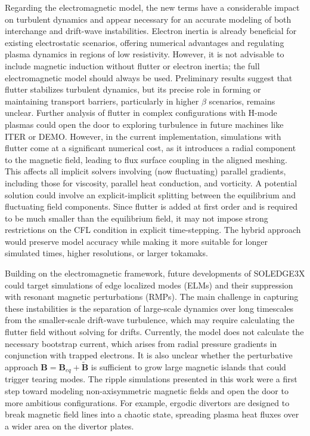 Regarding the electromagnetic model, the new terms have a considerable impact on turbulent dynamics and appear necessary for an accurate modeling of both interchange and drift-wave instabilities. Electron inertia is already beneficial for existing electrostatic scenarios, offering numerical advantages and regulating plasma dynamics in regions of low resistivity. However, it is not advisable to include magnetic induction without flutter or electron inertia; the full electromagnetic model should always be used. Preliminary results suggest that flutter stabilizes turbulent dynamics, but its precise role in forming or maintaining transport barriers, particularly in higher $\beta$ scenarios, remains unclear. Further analysis of flutter in complex configurations with H-mode plasmas could open the door to exploring turbulence in future machines like ITER or DEMO. However, in the current implementation, simulations with flutter come at a significant numerical cost, as it introduces a radial component to the magnetic field, leading to flux surface coupling in the aligned meshing. This affects all implicit solvers involving (now fluctuating) parallel gradients, including those for viscosity, parallel heat conduction, and vorticity. A potential solution could involve an explicit-implicit splitting between the equilibrium and fluctuating field components. Since flutter is added at first order and is required to be much smaller than the equilibrium field, it may not impose strong restrictions on the CFL condition in explicit time-stepping. The hybrid approach would preserve model accuracy while making it more suitable for longer simulated times, higher resolutions, or larger tokamaks.

Building on the electromagnetic framework, future developments of SOLEDGE3X could target simulations of edge localized modes (ELMs) and their suppression with resonant magnetic perturbations (RMPs). The main challenge in capturing these instabilities is the separation of large-scale dynamics over long timescales from the smaller-scale drift-wave turbulence, which may require calculating the flutter field without solving for drifts. Currently, the model does not calculate the necessary bootstrap current, which arises from radial pressure gradients in conjunction with trapped electrons. It is also unclear whether the perturbative approach $\mathbf{B} = \mathbf{B}_{eq} + \tilde{\mathbf{B}}$ is sufficient to grow large magnetic islands that could trigger tearing modes. The ripple simulations presented in this work were a first step toward modeling non-axisymmetric magnetic fields and open the door to more ambitious configurations. For example, ergodic divertors are designed to break magnetic field lines into a chaotic state, spreading plasma heat fluxes over a wider area on the divertor plates.







